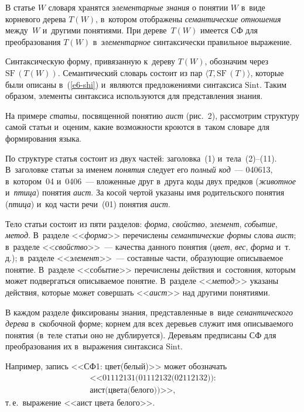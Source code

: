 \begin{multicols}{2}
     В статье $W$ словаря хранятся \textit{элементарные знания} о понятии 
$W$ в~виде корневого дерева $T(W)$, в~котором отображены 
\textit{семантические отношения} между~$W$ и~другими понятиями. При 
дереве~$T(W)$ имеется СФ для преобразования $T(W)$ 
в~\textit{элементарное} синтаксически правильное выражение.
     
     Синтаксическую форму, привязанную к~дереву $T(W)$, обозначим через 
     $\mathrm{SF}\,(T(W))$. 
Семантический словарь состоит из пар $\langle T, \mathrm{SF}\,(T)\rangle$, которые 
были описаны в~(\ref{e6-shi}) и~являются предложениями синтаксиса $\mathrm{Sint}$. 
Таким образом, элементы синтаксиса используются для представления 
знания.
     
     На примере \textit{статьи}, посвященной понятию \textit{аист} 
(рис.~2), рассмотрим структуру самой \mbox{статьи} и~оценим, какие возможности 
кроются в~таком словаре для формирования языка.
     

     
     По структуре статья состоит из двух частей: заголовка~(1)  
и~тела~(2)--(11). В~заголовке статьи за именем \textit{понятия} следует его 
\textit{полный код}~--- 040613, в~котором~04 и~0406~--- вложенные друг 
в~друга коды двух предков (\textit{животное} и~\textit{птица}) понятия 
\textit{аист}. За косой чертой указаны имя родительского понятия 
(\textit{птица}) и~код части речи~(01) понятия \textit{аист}.
     
     Тело статьи состоит из пяти разделов: \textit{форма}, \textit{свойство}, 
\textit{элемент}, \textit{событие}, \textit{метод}. В~разделе 
<<\textit{форма}>> перечислены \textit{семантические формы} слова 
\textit{аист}; в~разделе <<\textit{свойство}>>~--- качества данного понятия 
(\textit{цвет}, \textit{вес}, \textit{форма} и~т.\,д.); в~разделе 
<<\textit{элемент}>>~--- составные части, образующие описываемое 
понятие. В~разделе <<событие>> перечислены действия и~состояния, 
которым может подвергаться опи\-сы\-ва\-емое понятие. В~разделе 
<<\textit{метод}>> указаны действия, которые может совершать 
<<\textit{аист}>> над другими понятиями. 
     
     В каждом разделе фиксированы знания, представленные в~виде 
\textit{семантического дерева} в~скобочной форме; корнем для всех деревьев 
служит имя описываемого понятия (в~теле статьи оно не дублируется). 
Деревьям предписаны СФ для преобразования их в~выражения синтаксиса 
$\mathrm{Sint}$.
     
     Например, запись <<{СФ}1: {цвет}({белый})>> может 
обозначать 
\begin{multline*}
\mbox{<<01112131(01112132(02112132)):}\\
\mbox{{аист}({цвета}({белого
}))>>},
\end{multline*}
 т.\,е.\ выражение <<{аист цвета белого}>>.
     

\end{multicols}
